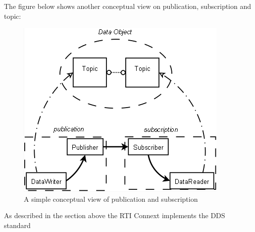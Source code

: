 \documentclass[Main]{subfiles}
\begin{document}
The figure below shows another conceptual view on publication, subscription and topic: 

\begin{figure}[H]
\centering
\includegraphics[scale=0.7]{Figure/PublicationAndSubscription.png}
\caption{A simple conceptual view of publication and subscription \cite{ddsopen}}
\end{figure}




As described in the section above the RTI Connext implements the DDS standard
\end{document}
